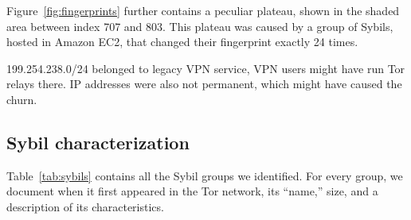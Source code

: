 Figure~\ref{fig:fingerprints} further contains a peculiar plateau, shown in the
shaded area between index 707 and 803.  This plateau was caused by a group of
Sybils, hosted in Amazon EC2, that changed their fingerprint exactly 24 times.

199.254.238.0/24
belonged to legacy VPN service, VPN users might have run Tor relays there.
IP addresses were also not permanent, which might have caused the churn.


\subsection{Sybil characterization}
\label{sec:sybil_groups}
Table~\ref{tab:sybils} contains all the Sybil groups we identified.  For every
group, we document when it first appeared in the Tor network, its ``name,''
size, and a description of its characteristics.

